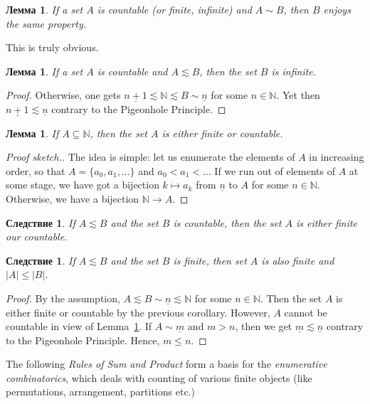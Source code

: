 \documentclass[12pt,notitlepage]{article}
\theoremstyle{plain}
\newtheorem{lemma}[thm]{Лемма}
\newtheorem{corr}[thm]{Следствие}
\theoremstyle{definition}
\theoremstyle{plain}
\newcommand{\N}{\mathbb{N}}
\newcommand{\ul}[1]{\underline{#1}}
\newcommand{\1}{\mathbf{1}}
\newcommand{\0}{\mathbf{0}}
\begin{document}
\begin{lemma}
	If a set $A$ is countable \emph{(}or finite, infinite\emph{)} and $A \sim B$, then $B$ enjoys the same property.
\end{lemma}
\noindent This is truly obvious.

\begin{lemma}\label{L10:count_inf}
	If a set $A$ is countable and $A \lesssim B$, then the set $B$ is infinite.
\end{lemma}
\begin{proof}
	Otherwise, one gets $\ul{n+1} \lesssim \N \lesssim B \sim \ul{n}$ for some $n \in \N$. Yet then $\ul{n+1} \lesssim \ul{n}$ contrary to the Pigeonhole Principle.
\end{proof}

\begin{lemma}
	If $A \subseteq \N$, then the set $A$ is either finite or countable.
\end{lemma}
\begin{proof}[Proof sketch.]
	The idea is simple: let us enumerate the elements of $A$ in increasing order, so that $A = \{a_0, a_1, \ldots\}$ and $a_0 < a_1 < \ldots$ If we run out of elements of $A$ at some stage, we have got a bijection $k \mapsto a_k$ from $\ul{n}$ to $A$ for some $n \in \N$. Otherwise, we have a bijection $\N \to A$.
\end{proof}

\begin{corr}\label{L10:count_sbs}
	If $A \lesssim B$ and the set $B$ is countable, then the set $A$ is either finite our countable.
\end{corr}

\begin{corr}\label{L10:fin_sbs}
	If $A \lesssim B$ and the set $B$ is finite, then set $A$ is also finite and $|A| \leq |B|$.
\end{corr}
\begin{proof}
	By the assumption, $A \lesssim B \sim \ul{n} \lesssim \N$ for some $n \in \N$. Then the set $A$ is either finite or countable by the previous corollary. However, $A$ cannot be countable in view of Lemma~\ref{L10:count_inf}. If $A \sim \ul{m}$ and $m > n$, then we get $\ul{m} \lesssim \ul{n}$ contrary to the Pigeonhole Principle. Hence, $m \leq n$.
\end{proof}

The following \emph{Rules of Sum and Product} form a basis for the \emph{enumerative combinatorics}, which deals with counting of various finite objects (like permutations, arrangement, partitions etc.)
\end{document}

